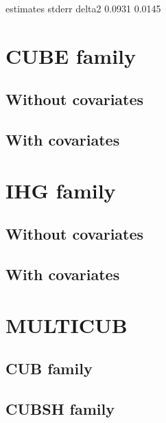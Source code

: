 \documentclass[letterpaper,10pt,english]{sphinxmanual}
\begin{document}
\noindent{}

\begin{sphinxVerbatim}[commandchars=\\\{\}]
     estimates  stderr
delta2  0.0931  0.0145
\end{sphinxVerbatim}


\section{CUBE family}
\label{\detokenize{manual:cube-family}}

\subsection{Without covariates}
\label{\detokenize{manual:id158}}

\subsection{With covariates}
\label{\detokenize{manual:id159}}

\section{IHG family}
\label{\detokenize{manual:ihg-family}}

\subsection{Without covariates}
\label{\detokenize{manual:id160}}

\subsection{With covariates}
\label{\detokenize{manual:id161}}

\section{MULTICUB}
\label{\detokenize{manual:multicub}}

\subsection{CUB family}
\label{\detokenize{manual:id162}}

\subsection{CUBSH family}
\label{\detokenize{manual:id163}}
\end{document}

